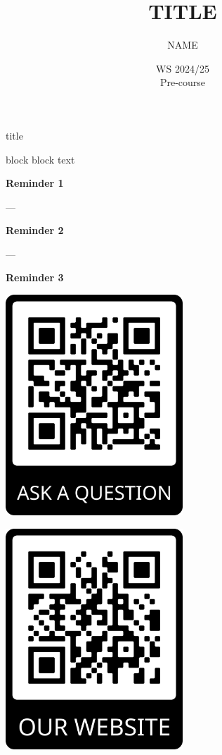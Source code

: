 \documentclass[aspectratio=169,hyperref={unicode}]{beamer}
\title{TITLE}
\author{NAME}
\institute{Fachschaft General \& Computational Linguistics\\ \textbf{University of Tübingen}}
\date{WS 2024/25 \\ Pre-course}
\begin{document}
\frame{\titlepage}


\begin{frame}{title}
	
\begin{block}{block}
	block text
\end{block}

\end{frame}

\begin{frame}
\begin{center}
\textbf{Reminder 1}

---

\textbf{Reminder 2}

---

\textbf{Reminder 3}

\vspace{1em}

\begin{minipage}{0.4\textwidth}
\centering
    \includegraphics[width=0.5\textwidth]{QRqa.png}
  \end{minipage}
  \hfill
  \begin{minipage}{0.4\textwidth}
  \centering
    \includegraphics[width=0.5\textwidth]{QRweb.png}
  \end{minipage}
\end{center}
\end{frame}
\end{document}
